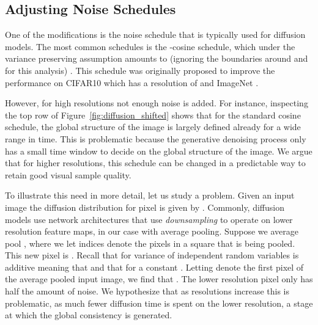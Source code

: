 \documentclass[nohyperref]{article}
\theoremstyle{plain}
\theoremstyle{definition}
\theoremstyle{remark}
\begin{document}
\subsection{Adjusting Noise Schedules}
One of the modifications is the noise schedule that is typically used for diffusion models. The most common schedules is the -cosine schedule, which under the variance preserving assumption amounts to  (ignoring the boundaries around  and  for this analysis) \citep{nichol2021improvedddpm}. This schedule was originally proposed to improve the performance on CIFAR10 which has a resolution of  and ImageNet . 


However, for high resolutions not enough noise is added. For instance, inspecting the top row of Figure~\ref{fig:diffusion_shifted} shows that for the standard cosine schedule, the global structure of the image is largely defined already for a wide range in time. This is problematic because the generative denoising process only has a small time window to decide on the global structure of the image. We argue that for higher resolutions, this schedule can be changed in a predictable way to retain good visual sample quality.

To illustrate this need in more detail, let us study a  problem. Given an input image  the diffusion distribution for pixel  is given by . Commonly, diffusion models use network architectures that use \textit{downsampling} to operate on lower resolution feature maps, in our case with average pooling. Suppose we average pool , where we let indices  denote the pixels in a  square that is being pooled. This new pixel is . Recall that for variance of independent random variables is additive meaning that  and that  for a constant . Letting  denote the first pixel of the average pooled input image, we find that . The lower resolution pixel  only has half the amount of noise. We hypothesize that as resolutions increase this is problematic, as much fewer diffusion time is spent on the lower resolution, a stage at which the global consistency is generated.
\end{document}
